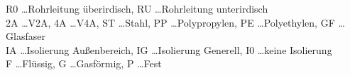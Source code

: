 \begin{table}[h!]
	\renewcommand*{\arraystretch}{1.2}
	\centering
	\caption{Rohrleitungsspezifikation der \textsc{Alberdingk Boley Leuna GmbH}}
	\label{tab:rohrspezi}
\end{table}%
\FloatBarrier
\vspace*{-2.5mm}
{\footnotesize R0 \dots Rohrleitung überirdisch, RU \dots Rohrleitung unterirdisch}\\
{\footnotesize 2A \dots V2A, 4A \dots V4A, ST \dots Stahl, PP \dots Polypropylen, PE \dots Polyethylen, GF \dots Glasfaser}\\
{\footnotesize IA \dots Isolierung Außenbereich, IG \dots Isolierung Generell, I0 \dots keine Isolierung}\\
{\footnotesize F \dots Flüssig, G \dots Gasförmig, P \dots Fest}

